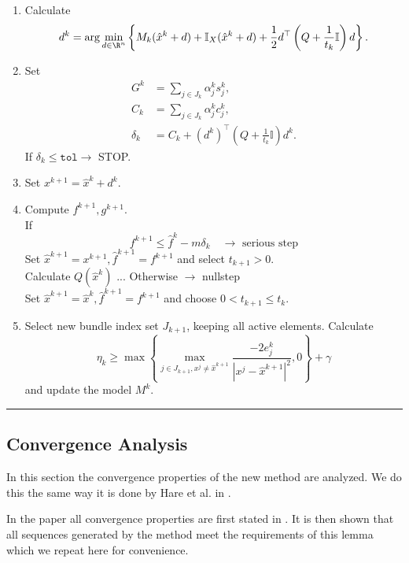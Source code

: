\begin{enumerate}
	\item Calculate \[d^k = \arg \min_{d \in \R^n} \left\{ M_k(\hat{x}^k+d)+\mathbb{I}_X(\hat{x}^k+d)+\frac{1}{2}d^{\top}\left(Q+\frac{1}{t_k}\mathbb{I}\right)d\right\}.\]
	\item Set %
		\begin{align*} 
		  G^k &= \sum_{j \in J_k}{\alpha_j^k s_j^k}, \\ %
			C_k &= \sum_{j \in J_k}{\alpha_j^k c_j^k}, \\
	    \delta_k &=  C_k + (d^k)^{\top}\left(Q+\frac{1}{t_k}\mathbb{I}\right)d^k.
		\end{align*}
		If \(\delta_k \leq \mathtt{tol} \rightarrow \) STOP.
	\item Set \( x^{k+1} = \hat{x}^k + d^k \).
	\item Compute \(f^{k+1}, g^{k+1}\). \\
	If 
	\[f^{k+1} \leq \hat{f}^k - m\delta_k \quad \rightarrow \text{ serious step} \]
	Set \(\hat{x}^{k+1} = x^{k+1}, \hat{f}^{k+1} = f^{k+1}\) and select \(t_{k+1} > 0\). \\
	Calculate \(Q(\hat{x}^k)\) ...
	Otherwise \(\rightarrow\) nullstep \\
	Set \(\hat{x}^{k+1} = \hat{x}^k, \hat{f}^{k+1}=f^{k+1}\) and choose \(0 < t_{k+1} \leq t_k\). 	
	\item Select new bundle index set \(J_{k+1}\), keeping all active elements. Calculate 
	\[ \eta_k \geq \max{\left\{\max_{j \in J_{k+1}, x^j \neq \hat{x}^{k+1}}{\frac{-2e_j^k}{|x^j - \hat{x}^{k+1}|^2}, 0}\right\}}+\gamma  \]
	and update the model \(M^k\).
\end{enumerate}
\vspace{1ex}
\hrule

\vspace{1.5em}


\subsection{Convergence Analysis}

In this section the convergence properties of the new method are analyzed. We do this the same way it is done by Hare et al. in \cite{Hare2016}.

In the paper all convergence properties are first stated in \cite[Lemma 5]{Hare2016}. It is then shown that all sequences generated by the method meet the requirements of this lemma which we repeat here for convenience.


